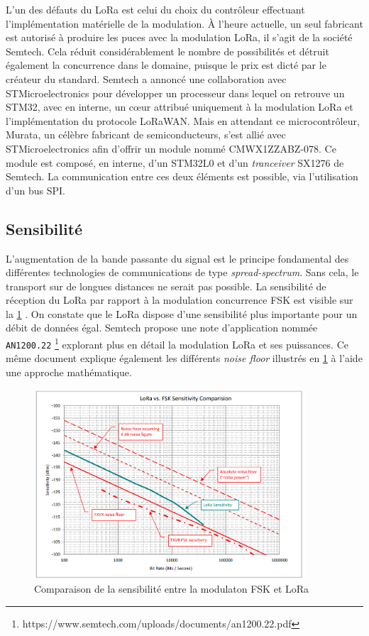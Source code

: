 L'un des défauts du LoRa est celui du choix du contrôleur effectuant l'implémentation matérielle de la modulation. À l'heure actuelle, un seul fabricant est autorisé à produire les puces avec la modulation LoRa, il s'agit de la société Semtech. Cela réduit considérablement le nombre de possibilités et détruit également la concurrence dans le domaine, puisque le prix est dicté par le créateur du standard. Semtech a annoncé une collaboration avec STMicroelectronics pour développer un processeur dans lequel on retrouve un STM32, avec en interne, un c\oe ur attribué uniquement à la modulation LoRa et l'implémentation du protocole LoRaWAN. Mais en attendant ce microcontrôleur, Murata, un célèbre fabricant de semiconducteurs, s'est allié avec STMicroelectronics afin d'offrir un module nommé CMWX1ZZABZ-078. Ce module est composé, en interne, d'un STM32L0 et d'un \textit{tranceiver} SX1276 de Semtech. La communication entre ces deux éléments est possible, via l'utilisation d'un bus SPI.

\subsection{Sensibilité}

L'augmentation de la bande passante du signal est le principe fondamental des différentes technologies de communications de type \textit{spread-spectrum}. Sans cela, le transport sur de longues distances ne serait pas possible. La sensibilité de réception du LoRa par rapport à la modulation concurrence FSK est visible sur la \cref{fig-lora_vs_fsk_sensibility} \cite{AN12002292:online}. On constate que le LoRa dispose d'une sensibilité plus importante pour un débit de données égal. Semtech propose une note d'application nommée \texttt{AN1200.22} \footnote{https://www.semtech.com/uploads/documents/an1200.22.pdf} explorant plus en détail la modulation LoRa et ses puissances. Ce même document explique également les différents \textit{noise floor} illustrés en \cref{fig-lora_vs_fsk_sensibility} à l'aide une approche mathématique.

\begin{figure}[ht!]
    \centering
    \includegraphics[width=0.9\textwidth]{Figures/StateOfTheArt/lora_vs_fsk_sensibility.png}
    \caption{Comparaison de la sensibilité entre la modulaton FSK et LoRa}
    \label{fig-lora_vs_fsk_sensibility}
\end{figure}


